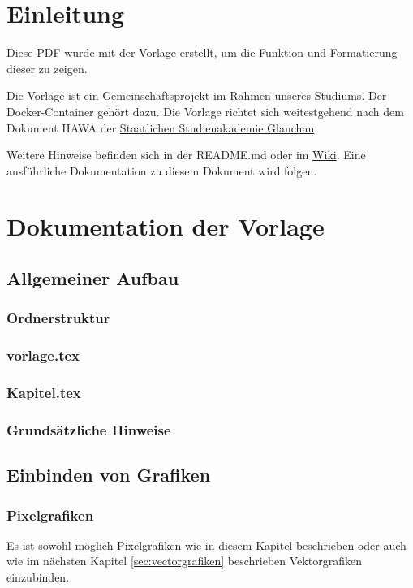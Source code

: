 
\section{Einleitung}
  Diese PDF wurde mit der Vorlage erstellt, um die Funktion und Formatierung dieser zu zeigen.

  Die Vorlage ist ein Gemeinschaftsprojekt im Rahmen unseres Studiums.
  Der Docker-Container gehört dazu.
  Die Vorlage richtet sich weitestgehend nach dem Dokument \ac{HAWA} der \href{https://www.ba-glauchau.de/}{Staatlichen Studienakademie Glauchau}.

  Weitere Hinweise befinden sich in der README.md oder im \href{https://github.com/DSczyrba/Vorlage-Latex/wiki}{Wiki}.
  Eine ausführliche Dokumentation zu diesem Dokument wird folgen.

\section{Dokumentation der Vorlage}
  \subsection{Allgemeiner Aufbau}
    \subsubsection{Ordnerstruktur}
    \subsubsection{vorlage.tex}
    \subsubsection{Kapitel.tex}
    \subsubsection{Grundsätzliche Hinweise}
  \subsection{Einbinden von Grafiken}
    \subsubsection{Pixelgrafiken}
      Es ist sowohl möglich Pixelgrafiken wie in diesem Kapitel beschrieben 
      oder auch wie im nächsten Kapitel \ref{sec:vectorgrafiken} beschrieben Vektorgrafiken einzubinden.

